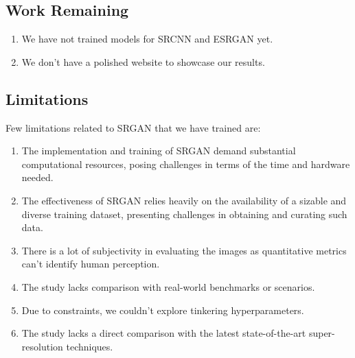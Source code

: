 \subsection{Work Remaining}
\begin{enumerate}
    \item We have not trained models for SRCNN and ESRGAN yet.
    \item We don't have a polished website to showcase our results.
\end{enumerate}  
\subsection{Limitations}
Few limitations related to SRGAN that we have trained are:
\begin{enumerate}
    \item The implementation and training of SRGAN demand substantial computational resources, posing challenges in terms of the time and hardware needed.
    \item  The effectiveness of SRGAN relies heavily on the availability of a sizable and diverse training dataset, presenting challenges in obtaining and curating such data.
    \item There is a lot of subjectivity in evaluating the images as quantitative metrics can't identify human perception.
    \item  The study lacks comparison with real-world benchmarks or scenarios.
    \item Due to constraints, we couldn't explore tinkering hyperparameters.
    \item The study lacks a direct comparison with the latest state-of-the-art super-resolution techniques.
\end{enumerate}

